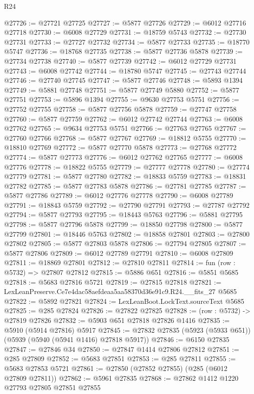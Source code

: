\begin{lexlean}{R24}
\begin{coremodule}
@27726 := @27721 @27725
@27727 := @5877 @27726
@27729 := @6012 @27716 @27718
@27730 := @6008 @27729
@27731 := @18759 @5743
@27732 := @27730 @27731
@27733 := @27727 @27732
@27734 := @5877 @27733
@27735 := @18770 @5747
@27736 := @18768 @27735
@27738 := @5877 @27736 @5878
@27739 := @27734 @27738
@27740 := @5877 @27739
@27742 := @6012 @27729 @27731
@27743 := @6008 @27742
@27744 := @18780 @5747
@27745 := @27743 @27744
@27746 := @27740 @27745
@27747 := @5877 @27746
@27748 := @5893 @1394
@27749 := @5881 @27748
@27751 := @5877 @27749 @5880
@27752 := @5877 @27751
@27753 := @5896 @1394
@27755 := @9630 @27753 @5751
@27756 := @27752 @27755
@27758 := @5877 @27756 @5878
@27759 := @27747 @27758
@27760 := @5877 @27759
@27762 := @6012 @27742 @27744
@27763 := @6008 @27762
@27765 := @9634 @27753 @5751
@27766 := @27763 @27765
@27767 := @27760 @27766
@27768 := @5877 @27767
@27769 := @18812 @5755
@27770 := @18810 @27769
@27772 := @5877 @27770 @5878
@27773 := @27768 @27772
@27774 := @5877 @27773
@27776 := @6012 @27762 @27765
@27777 := @6008 @27776
@27778 := @18822 @5755
@27779 := @27777 @27778
@27780 := @27774 @27779
@27781 := @5877 @27780
@27782 := @18833 @5759
@27783 := @18831 @27782
@27785 := @5877 @27783 @5878
@27786 := @27781 @27785
@27787 := @5877 @27786
@27789 := @6012 @27776 @27778
@27790 := @6008 @27789
@27791 := @18843 @5759
@27792 := @27790 @27791
@27793 := @27787 @27792
@27794 := @5877 @27793
@27795 := @18443 @5763
@27796 := @5881 @27795
@27798 := @5877 @27796 @5878
@27799 := @18850 @27798
@27800 := @5877 @27799
@27801 := @18446 @5763
@27802 := @18858 @27801
@27803 := @27800 @27802
@27805 := @5877 @27803 @5878
@27806 := @27794 @27805
@27807 := @5877 @27806
@27809 := @6012 @27789 @27791
@27810 := @6008 @27809
@27811 := @18869 @27801
@27812 := @27810 @27811
@27814 := fun (row : @5732) => @27807 @27812
@27815 := @5886 @651
@27816 := @5851 @5685
@27818 := @5683 @27816 @5721
@27819 := @27815 @27818
@27821 := LexLeanPreserve.Ce7e4dac58aefdeaa5aa58370d36e91c9.R24.__fits_27 @5685
@27822 := @5892 @27821
@27824 := LexLeanBoot.LockText.sourceText @5685
@27825 := @285 @27824
@27826 := @27822 @27825
@27828 := (row : @5732) -> @27819 @27826
@27832 := @5903 @651 @27818 @27826 @1416
@27835 := @5910 (@5914 @27816) @5917
@27845 := @27832 @27835 (@5923 (@5933 @651)) (@5939 (@5940 (@5941 @1416) @27818 @5917))
@27846 := @6150 @27835
@27847 := @27846 @34
@27850 := @27847 @1414 @27806 @27812
@27851 := @285 @27809
@27852 := @5683 @27851
@27853 := @285 @27811
@27855 := @5683 @27853 @5721
@27861 := @27850 (@27852 @27855) (@285 (@6012 @27809 @27811))
@27862 := @5961 @27835
@27868 := @27862 @1412 @1220 @27793 @27805 @27851 @27855

\end{coremodule}
\end{lexlean}
